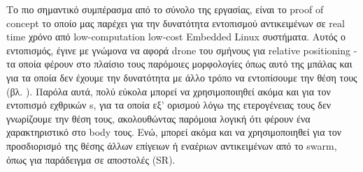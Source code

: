 Το πιο σημαντικό συμπέρασμα από το σύνολο της εργασίας, είναι το proof of concept το οποίο μας παρέχει για την δυνατότητα εντοπισμού αντικειμένων σε real time χρόνο από low-computation low-cost Embedded Linux συστήματα. Αυτός ο εντοπισμός, έγινε με γνώμονα να αφορά drone του σμήνους για relative positioning - τα οποία φέρουν στο πλαίσιο τους παρόμοιες μορφολογίες όπως αυτό της μπάλας και για τα οποία δεν έχουμε την δυνατότητα με άλλο τρόπο να εντοπίσουμε την θέση τους (βλ. ). Παρόλα αυτά, πολύ εύκολα μπορεί να χρησιμοποιηθεί ακόμα και για τον εντοπισμό εχθρικών s, για τα οποία εξ' ορισμού λόγω της ετερογένειας τους δεν γνωρίζουμε την θέση τους, ακολουθώντας παρόμοια λογική ότι φέρουν ένα χαρακτηριστικό στο body τους. Ενώ, μπορεί ακόμα και να χρησιμοποιηθεί για τον προσδιορισμό της θέσης άλλων επίγειων ή εναέριων αντικειμένων από το swarm, όπως για παράδειγμα σε αποστολές (SR).  

